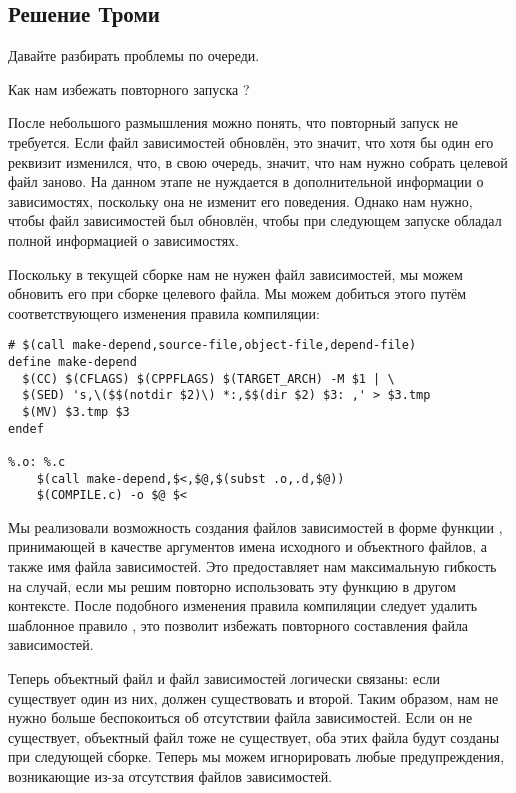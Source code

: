 \subsection{Решение Троми}

Давайте разбирать проблемы по очереди.

Как нам избежать повторного запуска \GNUmake{}?

После небольшого размышления можно понять, что повторный запуск
\GNUmake{} не требуется. Если файл зависимостей обновлён, это значит,
что хотя бы один его реквизит изменился, что, в свою очередь, значит,
что нам нужно собрать целевой файл заново. На данном этапе \GNUmake{}
не нуждается в дополнительной информации о зависимостях, поскольку она
не изменит его поведения. Однако нам нужно, чтобы файл зависимостей
был обновлён, чтобы при следующем запуске \GNUmake{} обладал полной
информацией о зависимостях.

Поскольку в текущей сборке нам не нужен файл зависимостей, мы можем
обновить его при сборке целевого файла. Мы можем добиться этого путём
соответствующего изменения правила компиляции:

{\footnotesize
\begin{verbatim}
# $(call make-depend,source-file,object-file,depend-file)
define make-depend
  $(CC) $(CFLAGS) $(CPPFLAGS) $(TARGET_ARCH) -M $1 | \
  $(SED) 's,\($$(notdir $2)\) *:,$$(dir $2) $3: ,' > $3.tmp
  $(MV) $3.tmp $3
endef

%.o: %.c
    $(call make-depend,$<,$@,$(subst .o,.d,$@))
    $(COMPILE.c) -o $@ $<
\end{verbatim}
}

Мы реализовали возможность создания файлов зависимостей в форме
функции , принимающей в качестве аргументов
имена исходного и объектного файлов, а также имя файла
зависимостей. Это предоставляет нам максимальную гибкость на случай,
если мы решим повторно использовать эту функцию в другом контексте.
После подобного изменения правила компиляции следует удалить шаблонное
правило \command{\%.d: \%.c}, это позволит избежать повторного
составления файла зависимостей.

Теперь объектный файл и файл зависимостей логически связаны: если
существует один из них, должен существовать и второй. Таким образом,
нам не нужно больше беспокоиться об отсутствии файла зависимостей.
Если он не существует, объектный файл тоже не существует, оба этих
файла будут созданы при следующей сборке. Теперь мы можем игнорировать
любые предупреждения, возникающие из-за отсутствия файлов
зависимостей.

